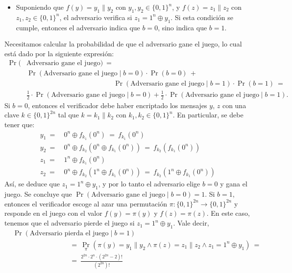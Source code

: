 \begin{enumerate}
\begin{itemize}
  \item Suponiendo que $f(y) = y_1 \| y_2$ con $y_1, y_2 \in \{0,1\}^n$, y
$f(z) = z_1 \| z_2$ con $z_1, z_2 \in \{0,1\}^n$, el adversario verifica si $z_1 = 1^n \oplus y_1$.
    Si esta condición se cumple, entonces el adversario
    indica que $b=0$, sino indica que $b=1$.
\end{itemize}
Necesitamos calcular la probabilidad de que el adversario gane el
juego, lo cual está dado por la siguiente expresión:
\begin{align*}
  \Pr(&\text{Adversario gane el juego}) \ =\\
  &\Pr(\text{Adversario gane el juego} \mid b=0) \cdot \Pr(b=0) \ +\\
  &\hspace{152pt} \Pr(\text{Adversario gane el juego} \mid b=1) \cdot \Pr(b=1) \ =\\
  &\frac{1}{2} \cdot \Pr(\text{Adversario gane el juego} \mid b=0) + \frac{1}{2} \cdot \Pr(\text{Adversario gane el juego} \mid b=1).
\end{align*}
Si $b = 0$, entonces el verificador debe haber encriptado los mensajes
$y$, $z$ con una clave $k \in \{0,1\}^{2n}$ tal que $k = k_1 \| k_2$ con $k_1, k_2 \in \{0,1\}^n$. En particular, se debe tener que:
\begin{align*}
y_1 \ = \ &0^n \oplus f_{k_1}(0^n) \ = \ f_{k_1}(0^n)\\ 
y_2 \ = \ &0^n \oplus f_{k_2}(0^n \oplus f_{k_1}(0^n)) \ = \ f_{k_2}(f_{k_1}(0^n))\\ 
z_1 \ = \ &1^n \oplus f_{k_1}(0^n)\\
z_2 \ = \ &0^n \oplus f_{k_2}(1^n \oplus f_{k_1}(0^n)) \ = \ f_{k_2}(1^n \oplus f_{k_1}(0^n)) 
\end{align*}
Así, se deduce que $z_1 = 1^n \oplus y_1$, y por lo tanto el adversario elige $b = 0$ y gana el juego. Se concluye
que $ \Pr(\text{Adversario gane el juego} \mid b=0) = 1$.  Si $b = 1$,
entonces el verificador escoge al azar una permutación $\pi :
\{0,1\}^{2n} \to \{0,1\}^{2n}$ y responde en el juego con el valor $f(y) =
\pi(y)$ y $f(z) = \pi(z)$. En este caso, tenemos que el adversario pierde el juego si $z_1 = 1^n \oplus y_1$.
Vale decir,
\begin{align*}
  & \Pr(\text{Adversario pierda el juego} \mid b=1)\\
  & \hspace{100pt} = \ \Pr_{\pi}(\pi(y) = y_1 \| y_2 \wedge \pi(z) = z_1 \| z_2 \wedge z_1 = 1^n \oplus y_1) \ =\\
  & \hspace{100pt} = \ \frac{2^{2n} \cdot 2^n \cdot (2^{2n} - 2)!}{(2^{2n})!}\\

\end{align*}
\end{enumerate}
